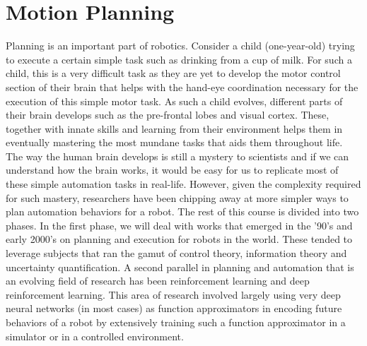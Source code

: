\chapter{Motion Planning} 
\label{chap:moplan}

Planning is an important part of robotics. Consider a child (one-year-old) trying to execute a certain simple task such as drinking from a cup of milk. For such a child, this is a very difficult task as they are yet to develop the motor control section of their brain that helps with the hand-eye coordination necessary for the execution of this simple motor task. As such a child evolves, different parts of their brain develops such as the pre-frontal lobes and visual cortex. These, together with innate skills and learning from their environment helps them in eventually mastering the most mundane tasks that aids them throughout life. The way the human brain develops is still a mystery to scientists and if we can understand how the brain works, it would be easy for us to replicate most of these simple automation tasks in real-life. However, given the complexity required for such mastery, researchers have been chipping away at more simpler  ways to plan automation behaviors for a robot. The rest of this course is divided into two phases. In  the first phase, we will deal with works that emerged in the '90's and early 2000's on planning and execution for robots in the world. These tended to leverage subjects that ran the gamut of control theory, information theory and uncertainty quantification. A second parallel in planning and automation that is an evolving field of research has been reinforcement learning and deep reinforcement learning. This area of research involved largely using very deep neural networks (in most cases) as function approximators in encoding future behaviors of a robot by extensively training such a function approximator in a simulator or in a controlled environment.

